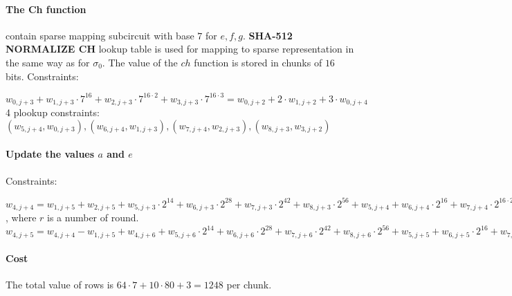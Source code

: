 \paragraph{The Ch function}
contain sparse mapping subcircuit with base $7$ for $e, f ,g$.
\textbf{SHA-512 NORMALIZE CH} lookup table is used for mapping to sparse representation in the same way as for $\sigma_0$.
The value of the $ch$ function is stored in chunks of $16$ bits.
Constraints:
\begin{center}
    $w_{0, j + 3} + w_{1, j + 3} \cdot 7^{16} + w_{2, j + 3} \cdot 7^{16 \cdot 2} + w_{3, j + 3} \cdot 7^{16 \cdot 3} = w_{0, j + 2} + 2 \cdot w_{1, j + 2} + 3 \cdot w_{0, j + 4}$ \\
    4 plookup constraints: $( w_{5, j + 4}, w_{0, j + 3}), ( w_{6, j + 4}, w_{1, j + 3}), (w_{7, j + 4}, w_{2, j + 3}), (w_{8, j + 3}, w_{3, j + 2})$ \\
\end{center}

\paragraph{Update the values $a$ and $e$}
Constraints:
\begin{center}
    $w_{4, j + 4} = w_{1, j + 5} + w_{2, j + 5} + w_{5, j + 3} \cdot 2^{14} + w_{6, j + 3} \cdot  2^{28} + w_{7, j + 3} \cdot 2^{42} + w_{8, j + 3} \cdot 2^{56} + w_{5, j + 4} + w_{6, j + 4} \cdot 2^{16} + w_{7, j + 4} \cdot 2^{16 \cdot 2} + w_{8, j + 4} \cdot 2^{16 \cdot 3} + k[r] + w_{3, j + 5}$, where $r$ is a number of round. \\
    $w_{4, j + 5} = w_{4, j + 4} - w_{1, j + 5} + w_{4, j + 6} + w_{5, j + 6} \cdot 2^{14} + w_{6, j + 6} \cdot  2^{28} + w_{7, j + 6} \cdot 2^{42} + w_{8, j + 6} \cdot 2^{56} + w_{5, j + 5} + w_{6, j + 5} \cdot 2^{16} + w_{7, j + 5} \cdot 2^{16 \cdot 2} + w_{8, j + 5} \cdot 2^{16 \cdot 3}$
\end{center}

\paragraph{Cost}
The total value of rows is $64 \cdot 7 + 10 \cdot 80 + 3 = 1248$ per chunk.
